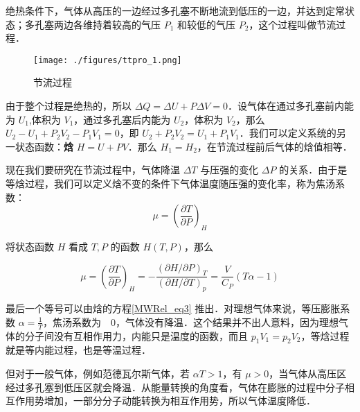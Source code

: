 

绝热条件下，气体从高压的一边经过多孔塞不断地流到低压的一边，并达到定常状态；多孔塞两边各维持着较高的气压 $P_1$ 和较低的气压 $P_2$，这个过程叫做节流过程．

\begin{figure}[ht]
\centering
\texttt{[image: ./figures/ttpro\_1.png]}
\caption{节流过程} \label{ttpro_fig1}
\end{figure}

由于整个过程是绝热的，所以 $\Delta Q=\Delta U+P\Delta V=0$．设气体在通过多孔塞前内能为 $U_1$,体积为 $V_1$，通过多孔塞后内能为 $U_2$，体积为 $V_2$，那么 $U_2-U_1+P_2V_2-P_1V_1=0$，即 $U_2+P_2V_2=U_1+P_1V_1$．我们可以定义系统的另一状态函数：\textbf{焓} $H=U+PV$．那么 $H_1=H_2$，在节流过程前后气体的焓值相等．

现在我们要研究在节流过程中，气体降温 $\Delta T$ 与压强的变化 $\Delta P$ 的关系．由于是等焓过程，我们可以定义焓不变的条件下气体温度随压强的变化率，称为焦汤系数：
\begin{equation}
\mu=\left(\frac{\partial T}{\partial P}\right)_H
\end{equation}

将状态函数 $H$ 看成 $T,P$ 的函数 $H(T,P)$，那么

\begin{equation}
\mu=\left(\frac{\partial T}{\partial P}\right)_H=
-\frac{(\partial H/\partial P)_T}{(\partial H/\partial T)_p}
=\frac{V}{C_P}(T\alpha-1)
\end{equation}

最后一个等号可以由焓的方程\autoref{MWRel_eq3} 推出．对理想气体来说，等压膨胀系数 $\alpha=\frac{1}{T}$，焦汤系数为　$0$，气体没有降温．这个结果并不出人意料，因为理想气体的分子间没有互相作用力，内能只是温度的函数，而且 $p_1V_1=p_2V_2$，等焓过程就是等内能过程，也是等温过程．

但对于一般气体，例如范德瓦尔斯气体，若 $\alpha T>1$，有 $\mu>0$，当气体从高压区经过多孔塞到低压区就会降温．从能量转换的角度看，气体在膨胀的过程中分子相互作用势增加，一部分分子动能转换为相互作用势，所以气体温度降低．
